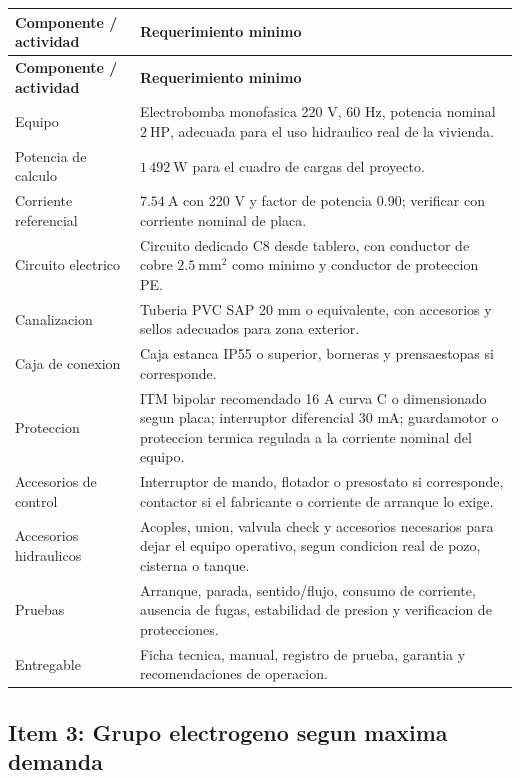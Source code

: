 \documentclass[12pt,letterpaper]{report}
\newcommand{\reqheader}{\rowcolor{modelblue!14}}
\begin{document}
\begin{longtable}{P{0.30\textwidth} P{0.62\textwidth}}
\toprule
\reqheader \textbf{Componente / actividad} & \textbf{Requerimiento minimo} \\
\midrule
\endfirsthead
\toprule
\reqheader \textbf{Componente / actividad} & \textbf{Requerimiento minimo} \\
\midrule
\endhead
Equipo & Electrobomba monofasica 220 V, 60 Hz, potencia nominal \(2\ \text{HP}\), adecuada para el uso hidraulico real de la vivienda. \\
Potencia de calculo & \(1\,492\ \text{W}\) para el cuadro de cargas del proyecto. \\
Corriente referencial & \(7.54\ \text{A}\) con 220 V y factor de potencia 0.90; verificar con corriente nominal de placa. \\
Circuito electrico & Circuito dedicado C8 desde tablero, con conductor de cobre \(2.5\ \text{mm}^2\) como minimo y conductor de proteccion PE. \\
Canalizacion & Tuberia PVC SAP 20 mm o equivalente, con accesorios y sellos adecuados para zona exterior. \\
Caja de conexion & Caja estanca IP55 o superior, borneras y prensaestopas si corresponde. \\
Proteccion & ITM bipolar recomendado 16 A curva C o dimensionado segun placa; interruptor diferencial 30 mA; guardamotor o proteccion termica regulada a la corriente nominal del equipo. \\
Accesorios de control & Interruptor de mando, flotador o presostato si corresponde, contactor si el fabricante o corriente de arranque lo exige. \\
Accesorios hidraulicos & Acoples, union, valvula check y accesorios necesarios para dejar el equipo operativo, segun condicion real de pozo, cisterna o tanque. \\
Pruebas & Arranque, parada, sentido/flujo, consumo de corriente, ausencia de fugas, estabilidad de presion y verificacion de protecciones. \\
Entregable & Ficha tecnica, manual, registro de prueba, garantia y recomendaciones de operacion. \\
\bottomrule
\end{longtable}

\subsection{Item 3: Grupo electrogeno segun maxima demanda}
\end{document}
